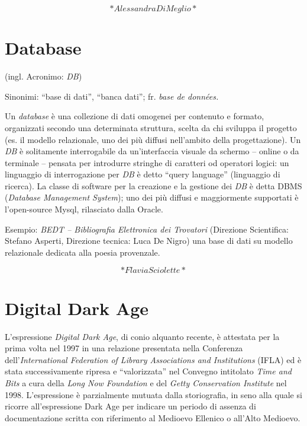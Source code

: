 \documentclass[
  b5paper,
  twoside,
  11pt,
  chapterprefix=false,
  bibliography=totocnumbered,
  listof=flat]{scrbook}
\begin{document}
\[*Alessandra Di Meglio*\]

\hypertarget{database}{%
\chapter{Database}\label{database}}

(ingl. Acronimo: \emph{DB})

Sinonimi: \enquote{base di dati}, \enquote{banca dati}; fr. \emph{base de données.}

Un \emph{database} è una collezione di dati omogenei per contenuto e formato,
organizzati secondo una determinata struttura, scelta da chi sviluppa il
progetto (es. il modello relazionale, uno dei più diffusi nell'ambito
della progettazione). Un \emph{DB} è solitamente interrogabile da
un'interfaccia visuale da schermo -- online o da terminale -- pensata
per introdurre stringhe di caratteri od operatori logici: un linguaggio
di interrogazione per \emph{DB} è detto \enquote{query language} (linguaggio di
ricerca). La classe di software per la creazione e la gestione dei \emph{DB}
è detta DBMS (\emph{Database Management System}); uno dei più diffusi e
maggiormente supportati è l'open-source Mysql, rilasciato dalla Oracle.

Esempio: \emph{BEDT -- Bibliografia Elettronica dei Trovatori} (Direzione
Scientifica: Stefano Asperti, Direzione tecnica: Luca De Nigro) una base
di dati su modello relazionale dedicata alla poesia provenzale.

\[*Flavia Sciolette*\]

\hypertarget{digital-dark-age}{%
\chapter{Digital Dark Age}\label{digital-dark-age}}

L'espressione \emph{Digital Dark Age}, di conio alquanto recente, è attestata
per la prima volta nel 1997 in una relazione presentata nella Conferenza
dell'\emph{International Federation of Library Associations and Institutions}
(IFLA) ed è stata successivamente ripresa e \enquote{valorizzata} nel Convegno
intitolato \emph{Time and Bits} a cura della \emph{Long Now Foundation} e del
\emph{Getty Conservation Institute} nel 1998. L'espressione è parzialmente
mutuata dalla storiografia, in seno alla quale si ricorre
all'espressione Dark Age per indicare un periodo di assenza di
documentazione scritta con riferimento al Medioevo Ellenico o all'Alto
Medioevo.
\end{document}
